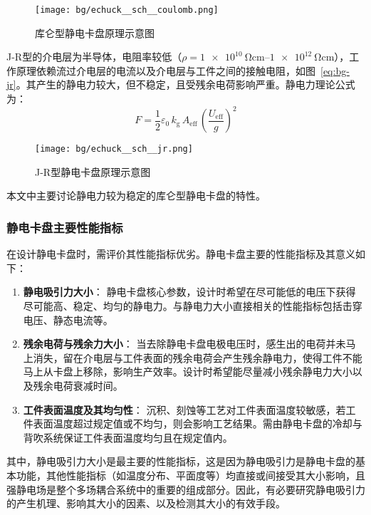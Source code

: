 \begin{figure}[h]
\centering
\texttt{[image: bg/echuck\_\_sch\_\_coulomb.png]}
\caption{库仑型静电卡盘原理示意图}
\label{fig:bg-echuck-sch-coulomb}
\end{figure}

\mbox{J-R}型的介电层为半导体，电阻率较低（$\rho = \SIrange{1e10}{1e12}{\ohm\cm}$），工作原理依赖流过介电层的电流以及介电层与工件之间的接触电阻，如图~\ref{eq:bg-jr}。其产生的静电力较大，但不稳定，且受残余电荷影响严重。静电力理论公式为：
\begin{equation}
\label{eq:bg-jr}
F = \frac{1}{2} {\varepsilon}_0 \, k_{\mathrm{g}} \, A_{\mathrm{eff}} \, {\left( \frac{U_{\mathrm{eff}}}{g} \right)}^2
\end{equation}

\begin{figure}[h]
\centering
\texttt{[image: bg/echuck\_\_sch\_\_jr.png]}
\caption{\mbox{J-R}型静电卡盘原理示意图}
\label{fig:bg-echuck-sch-jr}
\end{figure}

本文中主要讨论静电力较为稳定的库仑型静电卡盘的特性。

\subsubsection{静电卡盘主要性能指标}\label{sec:bg-bg-chuck-spec}

在设计静电卡盘时，需评价其性能指标优劣。静电卡盘主要的性能指标及其意义如下：

\begin{enumerate}
  \item \textbf{静电吸引力大小}：
    静电卡盘核心参数，设计时希望在尽可能低的电压下获得尽可能高、稳定、均匀的静电力。与静电力大小直接相关的性能指标包括击穿电压、静态电流等。
  \item \textbf{残余电荷与残余力大小}：
    当去除静电卡盘电极电压时，感生出的电荷并未马上消失，留在介电层与工件表面的残余电荷会产生残余静电力，使得工件不能马上从卡盘上移除，影响生产效率。设计时希望能尽量减小残余静电力大小以及残余电荷衰减时间。
  \item \textbf{工件表面温度及其均匀性}：
    沉积、刻蚀等工艺对工件表面温度较敏感，若工件表面温度超过规定值或不均匀，则会影响工艺结果。需由静电卡盘的冷却与背吹系统保证工件表面温度均匀且在规定值内。
\end{enumerate}

其中，静电吸引力大小是最主要的性能指标，这是因为静电吸引力是静电卡盘的基本功能，其他性能指标（如温度分布、平面度等）均直接或间接受其大小影响，且强静电场是整个多场耦合系统中的重要的组成部分。因此，有必要研究静电吸引力的产生机理、影响其大小的因素、以及检测其大小的有效手段。



